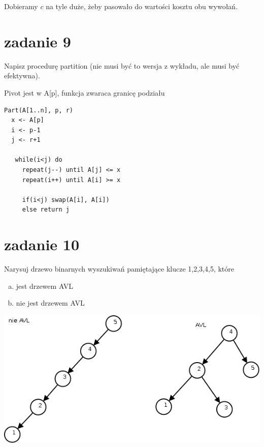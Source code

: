 Dobieramy $c$ na tyle duże, żeby pasowało do wartości kosztu obu wywołań.

\section{zadanie 9}
\begin{framed}
Napisz procedurę partition (nie musi być to wersja z wykładu, ale musi być efektywna).
\end{framed}
Pivot jest w A[p], funkcja zwaraca granicę podziału
\begin{lstlisting}
Part(A[1..n], p, r)
  x <- A[p] 
  i <- p-1 
  j <- r+1
  
   while(i<j) do
     repeat(j--) until A[j] <= x
     repeat(i++) until A[i] >= x
    
     if(i<j) swap(A[i], A[i])
     else return j 
\end{lstlisting}

\section{zadanie 10}
\begin{framed}
Narysuj drzewo binarnych wyszukiwań pamiętające klucze 1,2,3,4,5, które
\begin{enumerate}[a)]
	\item jest drzewem AVL
	\item nie jest drzewem AVL
\end{enumerate}
\end{framed}

  \includegraphics[width=16cm]{images/10.png}

